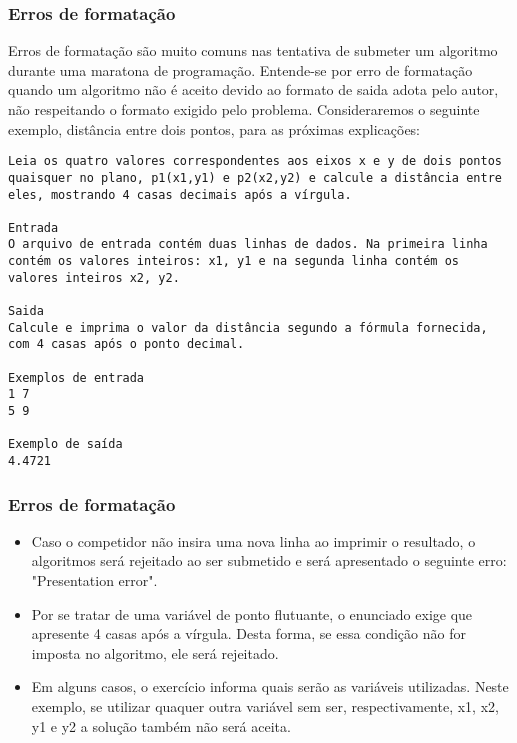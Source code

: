 \begin{frame} [fragile]
 \frametitle{Erros de formatação}
 Erros de formatação são muito comuns nas tentativa de submeter um algoritmo durante uma maratona de programação.
 Entende-se por erro de formatação quando um algoritmo não é aceito devido ao formato de saida adota pelo autor, não respeitando o formato exigido pelo problema.
 Consideraremos o seguinte exemplo, distância entre dois pontos, para as próximas explicações:
  \begin{lstlisting}
Leia os quatro valores correspondentes aos eixos x e y de dois pontos quaisquer no plano, p1(x1,y1) e p2(x2,y2) e calcule a distância entre eles, mostrando 4 casas decimais após a vírgula.

Entrada
O arquivo de entrada contém duas linhas de dados. Na primeira linha contém os valores inteiros: x1, y1 e na segunda linha contém os valores inteiros x2, y2.

Saida
Calcule e imprima o valor da distância segundo a fórmula fornecida, com 4 casas após o ponto decimal.

Exemplos de entrada
1 7
5 9

Exemplo de saída
4.4721
  \end{lstlisting}
 
\end{frame}

\begin{frame}
 \frametitle{Erros de formatação}
 \begin{itemize}
  \item Caso o competidor não insira uma nova linha ao imprimir o resultado, o algoritmos será rejeitado ao ser submetido e será apresentado o seguinte erro: "Presentation error".
  \item Por se tratar de uma variável de ponto flutuante, o enunciado exige que apresente 4 casas após a vírgula. Desta forma, se essa condição não for imposta no algoritmo, ele será rejeitado.
  \item Em alguns casos, o exercício informa quais serão as variáveis utilizadas. Neste exemplo, se utilizar quaquer outra variável sem ser, respectivamente, x1, x2, y1 e y2 a solução também não será aceita.
 \end{itemize}

\end{frame}
